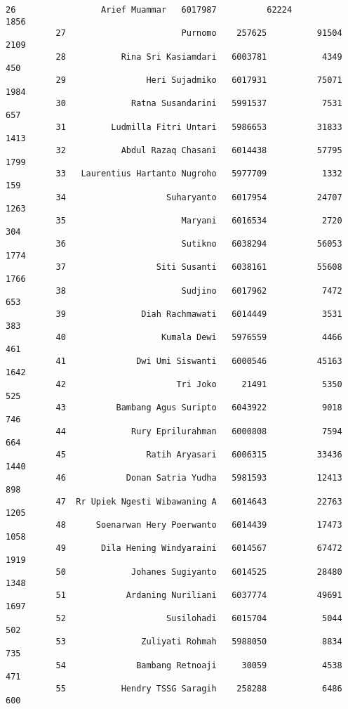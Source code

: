 \documentclass[11pt]{article}
\begin{document}
\begin{Verbatim}[commandchars=\\\{\}]
          26                 Arief Muammar   6017987          62224              1856   
          27                       Purnomo    257625          91504              2109   
          28           Rina Sri Kasiamdari   6003781           4349               450   
          29                Heri Sujadmiko   6017931          75071              1984   
          30             Ratna Susandarini   5991537           7531               657   
          31         Ludmilla Fitri Untari   5986653          31833              1413   
          32           Abdul Razaq Chasani   6014438          57795              1799   
          33   Laurentius Hartanto Nugroho   5977709           1332               159   
          34                    Suharyanto   6017954          24707              1263   
          35                       Maryani   6016534           2720               304   
          36                       Sutikno   6038294          56053              1774   
          37                  Siti Susanti   6038161          55608              1766   
          38                       Sudjino   6017962           7472               653   
          39               Diah Rachmawati   6014449           3531               383   
          40                   Kumala Dewi   5976559           4466               461   
          41              Dwi Umi Siswanti   6000546          45163              1642   
          42                      Tri Joko     21491           5350               525   
          43          Bambang Agus Suripto   6043922           9018               746   
          44             Rury Eprilurahman   6000808           7594               664   
          45                Ratih Aryasari   6006315          33436              1440   
          46            Donan Satria Yudha   5981593          12413               898   
          47  Rr Upiek Ngesti Wibawaning A   6014643          22763              1205   
          48      Soenarwan Hery Poerwanto   6014439          17473              1058   
          49       Dila Hening Windyaraini   6014567          67472              1919   
          50             Johanes Sugiyanto   6014525          28480              1348   
          51            Ardaning Nuriliani   6037774          49691              1697   
          52                    Susilohadi   6015704           5044               502   
          53               Zuliyati Rohmah   5988050           8834               735   
          54              Bambang Retnoaji     30059           4538               471   
          55           Hendry TSSG Saragih    258288           6486               600   

\end{Verbatim}
\end{document}

